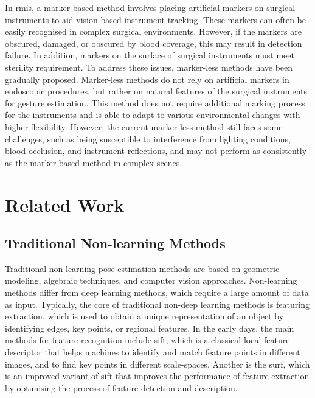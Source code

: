 \documentclass[12pt]{article}
\begin{document}
In \gls{rmis}, a marker-based method involves placing artificial markers on surgical instruments to aid vision-based instrument tracking\cite{villani2021development}. These markers can often be easily recognised in complex surgical environments. However, if the markers are obscured, damaged, or obscured by blood coverage, this may result in detection failure\cite{ma2021comprehensive}. In addition, markers on the surface of surgical instruments must meet sterility requirement\cite{xu2023graph}. To address these issues, marker-less methods have been gradually proposed\cite{reilink20133d}. Marker-less methods do not rely on artificial markers in endoscopic procedures, but rather on natural features of the surgical instruments for gesture estimation. This method does not require additional marking process for the instruments and is able to adapt to various environmental changes with higher flexibility. However, the current marker-less method still faces some challenges, such as being susceptible to interference from lighting conditions, blood occlusion, and instrument reflections, and may not perform as consistently as the marker-based method in complex scenes\cite{hein2021towards}.


\section{Related Work}
\subsection{Traditional Non-learning Methods}
Traditional non-learning pose estimation methods are based on geometric modeling, algebraic techniques, and computer vision approaches\cite{fan2024reinforcement}. Non-learning methods differ from deep learning methods, which require a large amount of data as input. Typically, the core of traditional non-deep learning methods is featuring extraction, which is used to obtain a unique representation of an object by identifying edges, key points, or regional features\cite{fan2024reinforcement}. In the early days, the main methods for feature recognition include \gls{sift}\cite{lakshmi2017image}, which is a classical local feature descriptor that helps machines to identify and match feature points in different images, and to find key points in different scale-spaces. Another is the \gls{surf}\cite{wijesinghe2010speed}, which is an improved variant of \gls{sift} that improves the performance of feature extraction by optimising the process of feature detection and description.
\end{document}
